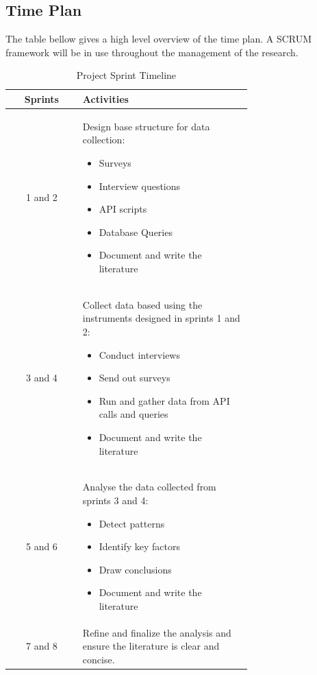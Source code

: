 \documentclass[conference]{IEEEtran}
\begin{document}
    \subsection{Time Plan}
        The table bellow gives a high level overview of the time plan. A SCRUM framework will be in use throughout the management of the research. 
        \begin{table}[h]
            \centering
            \caption{Project Sprint Timeline}
            \label{tab:sprint_timeline}
            \begin{tabular}{|c|p{0.7\linewidth}|}
            \hline
            \textbf{Sprints} & \textbf{Activities} \\ \hline
            1 and 2 & Design base structure for data collection:
            \begin{itemize}
                \item Surveys
                \item Interview questions
                \item API scripts
                \item Database Queries
                \item Document and write the literature
            \end{itemize} \\ \hline
            3 and 4 & Collect data based using the instruments designed in sprints 1 and 2:
            \begin{itemize}
                \item Conduct interviews
                \item Send out surveys
                \item Run and gather data from API calls and queries
                \item Document and write the literature
            \end{itemize} \\ \hline
            5 and 6 & Analyse the data collected from sprints 3 and 4:
            \begin{itemize}
                \item Detect patterns
                \item Identify key factors
                \item Draw conclusions
                \item Document and write the literature
            \end{itemize} \\ \hline
            7 and 8 & Refine and finalize the analysis and ensure the literature is clear and concise. \\ \hline
            \end{tabular}
        \end{table}
\end{document}
